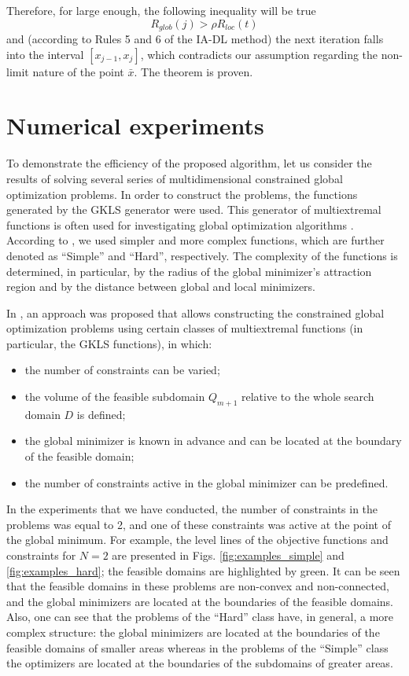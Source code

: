 \documentclass[twocolumn]{svjour3}          %
\begin{document}
	Therefore, for large enough, the following inequality will be true
\begin{equation}
	R_{glob}(j) > \rho R_{loc}(t)
\end{equation}
and (according to Rules 5 and 6 of the IA-DL method) the next iteration falls into the interval $[x_{j-1}, x_j]$, which contradicts our assumption regarding the non-limit nature of the point $\bar x$. The theorem is proven.



\section{Numerical experiments}
\label{sec:5}
To demonstrate the efficiency of the proposed algorithm, let us consider the results of solving several series of multidimensional constrained global optimization problems. In order to construct the problems, the functions generated by the GKLS generator \cite{Gaviano2003} were used. This generator of multiextremal functions is often used for investigating global optimization algorithms \cite{Paulavicius2014,Sergeyev2015,Barkalov2018}. According to \cite{Gaviano2003}, we used simpler and more complex functions, which are  further denoted as ``Simple'' and ``Hard'', respectively. The complexity of the functions is determined, in particular, by the radius of the global minimizer's attraction region and by the distance between global and local minimizers.
	
	In \cite{Gergel2017_2,Gergel2019}, an approach was proposed that allows constructing the constrained global optimization problems using certain classes of multiextremal functions (in particular, the GKLS functions), in which:
\begin{itemize}
  \item the number of constraints can be varied;
  \item the volume of the feasible subdomain $Q_{m+1}$ relative to the whole search domain $D$ is defined;
	\item the global minimizer is known in advance and can be located at the boundary of the feasible domain;
	\item the number of constraints active in the global minimizer can be predefined.
\end{itemize}	

	In the experiments that we have conducted, the number of constraints in the problems was equal to 2, and one of these constraints was active at the point of the global minimum. For example, the level lines of the objective functions and constraints for $N=2$ are presented in Figs. \ref{fig:examples_simple} and \ref{fig:examples_hard}; the feasible domains are highlighted by green. It can be seen that the feasible domains in these problems are non-convex and non-connected, and the global minimizers are located at the boundaries of the feasible domains. Also, one can see that the problems of the ``Hard'' class have, in general, a more complex structure: the global minimizers are located at the boundaries of the feasible domains of smaller areas whereas in the problems of the ``Simple'' class the optimizers are located at the boundaries of the subdomains of greater areas.
	
\end{document}
